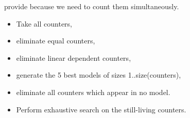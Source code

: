 provide because we need to count them simultaneously. 

\begin{itemize}

\item Take all counters,

\item eliminate equal counters,

\item eliminate linear dependent counters,

\item generate the 5 best models of sizes 1..size(counters),

\item eliminate all counters which appear in no model.

\item Perform exhaustive search on the still-living counters.

\end{itemize}


